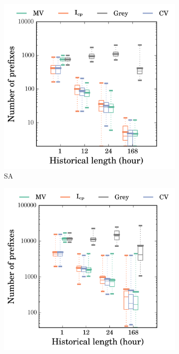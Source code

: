 \begin{figure}
\centering
		\centering
        \begin{subfigure}[b]{0.48\textwidth}
                \includegraphics[width=\textwidth]{gfx/chap2/grey_churn_box_method_compare_fs_sa.png}
                \caption{SA}
                \label{fig:churn_sa}
        \end{subfigure}
        \begin{subfigure}[b]{0.48\textwidth}
                \includegraphics[width=\textwidth]{gfx/chap2/grey_churn_box_method_compare_fs_sb.png}

\end{subfigure}
\end{figure}
